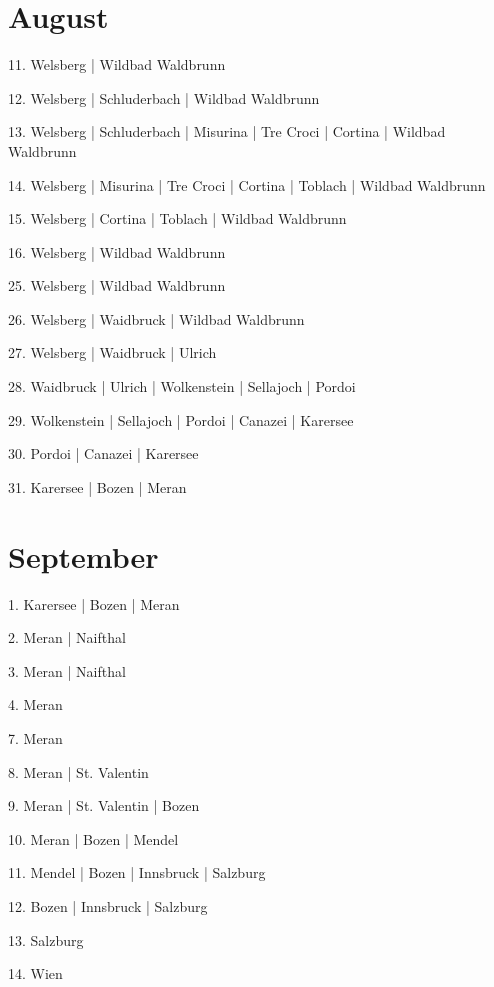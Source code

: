 \documentclass[twoside=false,titlepage=false,open=any, parskip=never, fontsize=10pt, headings=small, chapterprefix=false, appendixprefix=false, DIV=15]{scrbook}
\begin{document}
\begin{multicols}{3}
            \section*{August}
            11. Welsberg | Wildbad Waldbrunn\par
            12. Welsberg | Schluderbach | Wildbad Waldbrunn\par
            13. Welsberg | Schluderbach | Misurina | Tre Croci | Cortina | Wildbad Waldbrunn\par
            14. Welsberg | Misurina | Tre Croci | Cortina | Toblach | Wildbad Waldbrunn\par
            15. Welsberg | Cortina | Toblach | Wildbad Waldbrunn\par
            16. Welsberg | Wildbad Waldbrunn\par
            25. Welsberg | Wildbad Waldbrunn\par
            26. Welsberg | Waidbruck | Wildbad Waldbrunn\par
            27. Welsberg | Waidbruck | Ulrich\par
            28. Waidbruck | Ulrich | Wolkenstein | Sellajoch | Pordoi\par
            29. Wolkenstein | Sellajoch | Pordoi | Canazei | Karersee\par
            30. Pordoi | Canazei | Karersee\par
            31. Karersee | Bozen | Meran\par
            \section*{September}
            1. Karersee | Bozen | Meran\par
            2. Meran | Naifthal\par
            3. Meran | Naifthal\par
            4. Meran\par
            7. Meran\par
            8. Meran | St. Valentin\par
            9. Meran | St. Valentin | Bozen\par
            10. Meran | Bozen | Mendel\par
            11. Mendel | Bozen | Innsbruck | Salzburg\par
            12. Bozen | Innsbruck | Salzburg\par
            13. Salzburg\par
            14. Wien\par

\end{multicols}
\end{document}
